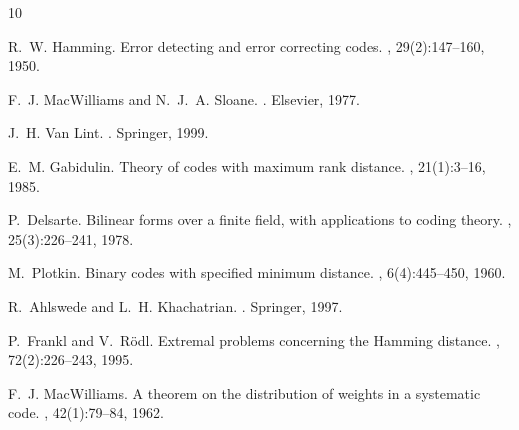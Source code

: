\documentclass[12pt]{article}
\begin{document}
\begin{thebibliography}{10}

R.~W. Hamming.
\newblock Error detecting and error correcting codes.
, 29(2):147--160, 1950.

F.~J. MacWilliams and N.~J.~A. Sloane.
.
\newblock Elsevier, 1977.

J.~H. {Van Lint}.
.
\newblock Springer, 1999.

E.~M. Gabidulin.
\newblock Theory of codes with maximum rank distance.
, 21(1):3--16, 1985.

P.~Delsarte.
\newblock Bilinear forms over a finite field, with applications to coding theory.
, 25(3):226--241, 1978.

M.~Plotkin.
\newblock Binary codes with specified minimum distance.
, 6(4):445--450, 1960.

R.~Ahlswede and L.~H. Khachatrian.
.
\newblock Springer, 1997.

P.~Frankl and V.~R{\"o}dl.
\newblock Extremal problems concerning the {H}amming distance.
, 72(2):226--243, 1995.

F.~J. MacWilliams.
\newblock A theorem on the distribution of weights in a systematic code.
, 42(1):79--84, 1962.

\end{thebibliography}
\end{document}
